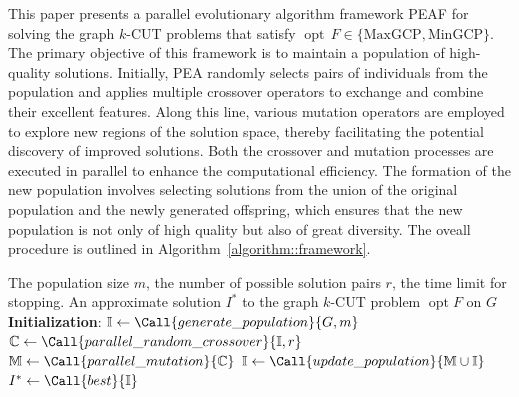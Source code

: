 \documentclass[12pt, a4paper]{article}%
\DeclareMathOperator*{\opt}{\ensuremath{opt}}
\numberwithin{equation}{section}
\theoremstyle{plain}
\begin{document}
	This paper presents a parallel evolutionary algorithm framework PEAF for solving the graph $k$-CUT problems that satisfy $\opt\, F\in\{\text{MaxGCP},\text{MinGCP}\}$. The primary objective of this framework is to maintain a population of high-quality solutions. Initially, PEA randomly selects pairs of individuals from the population and applies multiple crossover operators to exchange and combine their excellent features. Along this line, various mutation operators are employed to explore new regions of the solution space, thereby facilitating the potential discovery of improved solutions. Both the crossover and mutation processes are executed in parallel to enhance the computational efficiency. The formation of the new population involves selecting solutions from the union of the original population and the newly generated offspring, which ensures that the new population is not only of high quality but also of great diversity. The oveall procedure is outlined in Algorithm~\ref{algorithm::framework}.
	
	
	
	\begin{algorithm}[hbtp]
		\caption{A parallel evolutionary algorithm framework (PEAF) for $\opt F$ on $G=(V,E)$.} \label{algorithm::framework}
		\begin{algorithmic}[1] \small
			\Require The population size $m$, the number of possible solution pairs $r$, the time limit for stopping. 					\Ensure An approximate solution $I^*$ to the graph $k$-CUT problem $\opt F$ on $G$
			\State \textbf{Initialization}: $\mathbb{I}\gets\Call{generate\_population}{G,m}$  
			\State $\mathbb{C}\gets\Call{parallel\_random\_crossover}{\mathbb{I},r}$ 
			\State $ \mathbb{M}\gets\Call{parallel\_mutation}{\mathbb{C}}$ 
			\State $\mathbb{I}\gets \Call{update\_population}{\mathbb{M}\cup\mathbb{I}}$ 
			\EndWhile
			\State $I^*\gets \Call{best}{\mathbb{I}}$
			\State {}
		\end{algorithmic}  
	\end{algorithm}
	
\end{document}
